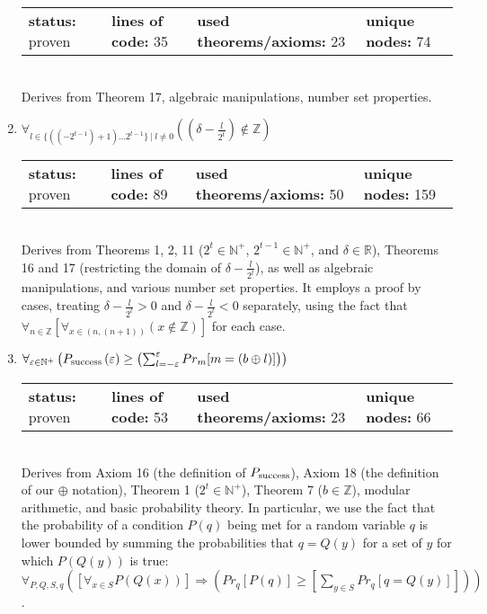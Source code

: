 \documentclass{article}[12pt]
\begin{document}
\begin{enumerate}
  \begin{tabular}{l | l | l | l}
    \textbf{status:} proven & \textbf{lines of code:} 35 & \textbf{used theorems/axioms:} 23 & \textbf{unique nodes:} 74
  \end{tabular} \hfill \\
Derives from Theorem 17, algebraic manipulations, number set properties.
\item $\forall_{l \in \{\left(\left(-2^{t - 1}\right) + 1\right)\ldots 2^{t - 1}\}~|~l \neq 0} \left(\left(\delta - \frac{l}{2^{t}}\right) \notin \mathbb{Z}\right)$ \hfill \\
  \begin{tabular}{l | l | l | l}
    \textbf{status:} proven & \textbf{lines of code:} 89 & \textbf{used theorems/axioms:} 50 & \textbf{unique nodes:} 159
  \end{tabular} \hfill \\
  Derives from Theorems 1, 2, 11 ($2^t \in \mathbb{N}^+$, $2^{t-1} \in \mathbb{N}^+$, and $\delta \in \mathbb{R}$), Theorems 16 and 17 (restricting the domain of $\delta - \frac{l}{2^t}$), as well as algebraic manipulations, and various number set properties.  It employs a proof by cases, treating $\delta - \frac{l}{2^t} > 0$ and $\delta - \frac{l}{2^t} < 0$ separately, using the fact that
$\forall_{ n  \in \mathbb{Z}} \left[\forall_{ x  \in \left(n,\left( n + 1 \right)\right)} \left(x \notin \mathbb{Z}\right)\right]$ for each case.
\item $\forall_{ \varepsilon  \in \mathbb{N}^+} \left(P_{\rm success}\left( \varepsilon \right) \geq \left(\sum_{l=-\varepsilon}^{\varepsilon} Pr_{m}[m = \left(b \oplus l\right)]\right)\right)$ \hfill \\
  \begin{tabular}{l | l | l | l}
    \textbf{status:} proven & \textbf{lines of code:} 53 & \textbf{used theorems/axioms:} 23 & \textbf{unique nodes:} 66
  \end{tabular} \hfill \\
  Derives from Axiom 16 (the definition of $P_{\rm success}$), Axiom 18 (the definition of our $\oplus$ notation), Theorem 1 ($2^t \in \mathbb{N}^+$), Theorem 7 ($b \in \mathbb{Z}$), modular arithmetic, and basic probability theory.  In particular, we use the fact that the probability of a condition $P(q)$ being met for a random variable $q$ is lower bounded by summing the probabilities that $q = Q(y)$ for a set of $y$ for which $P(Q(y))$ is true:
 $\forall_{ P , Q , S , q } \left(\left[\forall_{ x  \in S} P\left( Q\left( x \right) \right)\right] \Rightarrow \left(Pr_{q}[P\left( q \right)] \geq \left[\sum_{ y  \in S} Pr_{q}[q = Q\left( y \right)]\right]\right)\right)$.

\end{enumerate}
\end{document}
